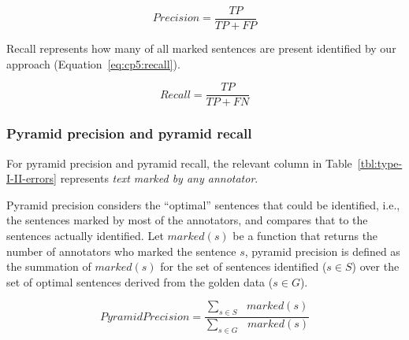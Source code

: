 \begin{equation}
\label{eq:cp5:precision}    
    Precision = \frac{TP}{TP + FP}
\end{equation}

\vspace{2mm}
Recall represents how many of all marked sentences are present identified by our approach (Equation~\ref{eq:cp5:recall}).


\begin{equation}
\label{eq:cp5:recall}        
    Recall = \frac{TP}{TP + FN}
\end{equation}




\subsubsection{Pyramid precision and pyramid recall}


For pyramid precision and pyramid recall, the relevant column in Table~\ref{tbl:type-I-II-errors} represents \textit{text marked by any annotator}. 


Pyramid precision considers the ``optimal'' sentences that could be identified, i.e., the sentences marked by most of the annotators, and compares that to the sentences  actually identified. Let $marked(s)$ be a function that returns the number of annotators who marked the sentence $s$, pyramid precision is defined as 
the summation of $marked(s)$ for the set of sentences identified ($s \in S$) over the set of optimal sentences derived from the golden data ($s \in G$).



\begin{equation}
\label{eq:cp5:pyramid-precision}    
    Pyramid Precision =  \frac{
        \sum_{s \in S} \text{ } marked(s)
    }{
        \sum_{s \in G} \text{ } marked(s)
    }
\end{equation}






